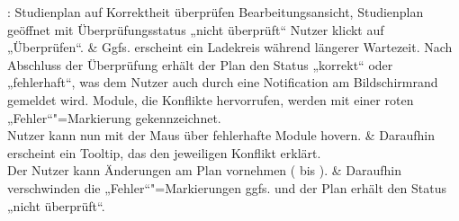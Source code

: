 \begin{usecase}{: Studienplan auf Korrektheit überprüfen}
	{Bearbeitungsansicht, Studienplan geöffnet mit Überprüfungsstatus „nicht überprüft“}
	Nutzer klickt auf „Überprüfen“.
	& Ggfs. erscheint ein Ladekreis während längerer Wartezeit. \newline 
	Nach Abschluss der Überprüfung erhält der Plan den Status „korrekt“ oder „fehlerhaft“, was dem Nutzer auch durch eine Notification am Bildschirmrand gemeldet wird. Module, die Konflikte hervorrufen, werden mit einer roten „Fehler“"=Markierung gekennzeichnet. \\
	\hline
	Nutzer kann nun mit der Maus über fehlerhafte Module hovern.
	& Daraufhin erscheint ein Tooltip, das den jeweiligen Konflikt erklärt. \\
	\hline
	Der Nutzer kann Änderungen am Plan vornehmen ( bis ). 
	& Daraufhin verschwinden die „Fehler“"=Markierungen ggfs. und der Plan erhält den Status „nicht überprüft“.
\end{usecase}

